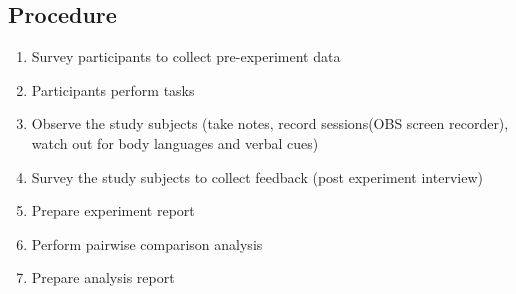 \documentclass[letterpaper,cleveref]{lipics-v2019}
\theoremstyle{definition}
\begin{document}
\subsection {Procedure}
\begin {enumerate}

\item Survey participants to collect pre-experiment data
\item Participants perform tasks
\item Observe the study subjects (take notes, record sessions(OBS screen recorder), watch out for body languages and verbal cues)
\item Survey the study subjects to collect feedback (post experiment interview)
\item Prepare experiment report
\item Perform pairwise comparison analysis
\item Prepare analysis report
\end {enumerate}
\end{document}
